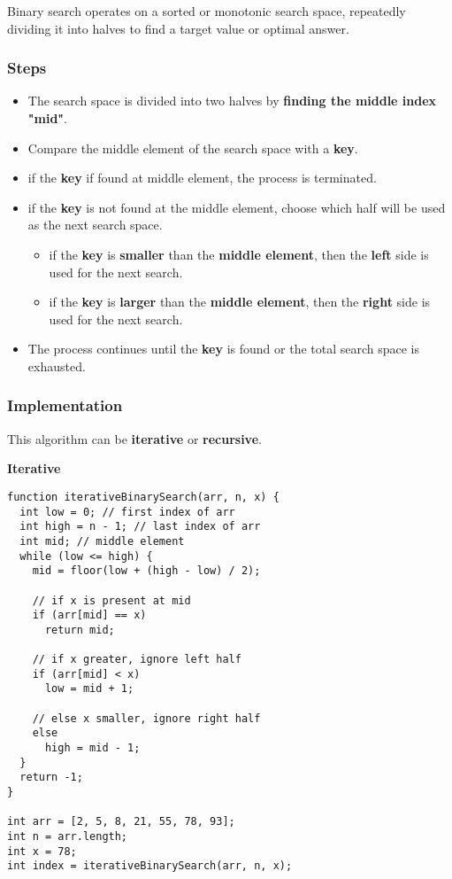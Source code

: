 Binary search operates on a sorted or monotonic search space, repeatedly dividing it into halves to find a target value or optimal answer.

\subsubsection*{Steps}

\begin{itemize}
  \item The search space is divided into two halves by \textbf{finding the middle index "mid"}.
  \item Compare the middle element of the search space with a \textbf{key}.
  \item if the \textbf{key} if found at middle element, the process is terminated.
  \item if the \textbf{key}  is not found at the middle element, choose which half will be used as the next search space.
  \begin{itemize}
    \item if the \textbf{key} is \textbf{smaller} than the \textbf{middle element}, then the \textbf{left} side is used for the next search.
    \item if the \textbf{key} is \textbf{larger} than the \textbf{middle element}, then the \textbf{right} side is used for the next search.
  \end{itemize}
  \item The process continues until the \textbf{key} is found or the total search space is exhausted.
\end{itemize}

\subsubsection*{Implementation}

This algorithm can be \textbf{iterative} or \textbf{recursive}.

\textbf{Iterative}

\begin{lstlisting}[style=general]
function iterativeBinarySearch(arr, n, x) {
  int low = 0; // first index of arr
  int high = n - 1; // last index of arr
  int mid; // middle element
  while (low <= high) {
    mid = floor(low + (high - low) / 2);

    // if x is present at mid
    if (arr[mid] == x)
      return mid;

    // if x greater, ignore left half
    if (arr[mid] < x)
      low = mid + 1;

    // else x smaller, ignore right half
    else
      high = mid - 1;
  }
  return -1;
}

int arr = [2, 5, 8, 21, 55, 78, 93];
int n = arr.length;
int x = 78;
int index = iterativeBinarySearch(arr, n, x);
\end{lstlisting}

